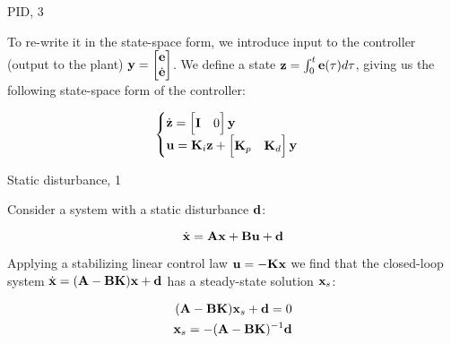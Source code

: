 \documentclass{beamer}
\begin{document}
\begin{frame}{PID, 3}
	\begin{flushleft}
		
		To re-write it in the state-space form, we introduce input to the controller (output to the plant) $\mathbf{y} = \begin{bmatrix}
		\mathbf{e} \\ \dot{\mathbf{e}}
		\end{bmatrix}$. We define a state $\mathbf{z} = \int_{0}^{t} \mathbf{e}(\tau) d \tau$, giving us the following state-space form of the controller:
		
		\begin{equation}
			\begin{cases}
				\dot{ \mathbf{z} }  = 
				\begin{bmatrix}
					\mathbf{I} & 0
				\end{bmatrix}\mathbf{y}
				\\
				\mathbf{u} = \mathbf{K}_i \mathbf{z} + 
				\begin{bmatrix}
					 \mathbf{K}_p &  \mathbf{K}_d
				\end{bmatrix} \mathbf{y}
			\end{cases}
		\end{equation}
		
	\end{flushleft}
\end{frame}




\begin{frame}{Static disturbance, 1}
	\begin{flushleft}
		
		Consider a system with a static disturbance $\mathbf{d}$:
		
		\begin{equation}
				\dot {\mathbf{x}} = \mathbf{A} \mathbf{x} + \mathbf{B} \mathbf{u} + \mathbf{d}
		\end{equation}
		
		Applying a stabilizing linear control law $\mathbf{u} = -\mathbf{K}\mathbf{x}$ we find that the closed-loop system $\dot {\mathbf{x}} =( \mathbf{A} -  \mathbf{B}  \mathbf{K}  )\mathbf{x} + \mathbf{d}$ has a steady-state solution $\mathbf{x}_s$:
		
		\begin{align}
			( \mathbf{A} -  \mathbf{B}  \mathbf{K}  )\mathbf{x}_s + \mathbf{d} = 0
			\\
			\mathbf{x}_s = -( \mathbf{A} -  \mathbf{B}  \mathbf{K}  )^{-1} \mathbf{d}
		\end{align}
		
		
	\end{flushleft}
\end{frame}
\end{document}
